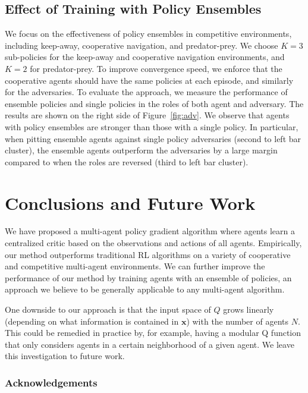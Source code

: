 \documentclass{article}
\begin{document}
\subsection{Effect of Training with Policy Ensembles}
We focus on the effectiveness of policy ensembles in competitive environments, including keep-away, cooperative navigation, and predator-prey. We choose $K=3$ sub-policies for the keep-away and cooperative navigation environments, and $K=2$ for predator-prey. To improve convergence speed, we enforce that the cooperative agents should have the same policies at each episode, and similarly for the adversaries.
To evaluate the approach, we measure the performance of ensemble policies and single policies in the roles of both agent and adversary. The results are shown on the right side of Figure~\ref{fig:adv}. We observe that agents with policy ensembles are stronger than those with a single policy. In particular, when pitting ensemble agents against single policy adversaries (second to left bar cluster), the ensemble agents outperform the adversaries by a large margin compared to when the roles are reversed (third to left bar cluster).



\section{Conclusions and Future Work}


We have proposed a multi-agent policy gradient algorithm where agents learn a centralized critic based on the observations and actions of all agents. Empirically, our method outperforms traditional RL algorithms on a variety of cooperative and competitive multi-agent environments. We can further improve the performance of our method by training agents with an ensemble of policies, an approach we believe to be generally applicable to any multi-agent algorithm.

One downside to our approach is that the input space of $Q$ grows linearly (depending on what information is contained in $\mathbf{x}$) with the number of agents $N$. This could be remedied in practice by, for example, having a modular Q function that only considers agents in a certain neighborhood of a given agent. We leave this investigation to future work. 





\subsubsection*{Acknowledgements}
\end{document}

